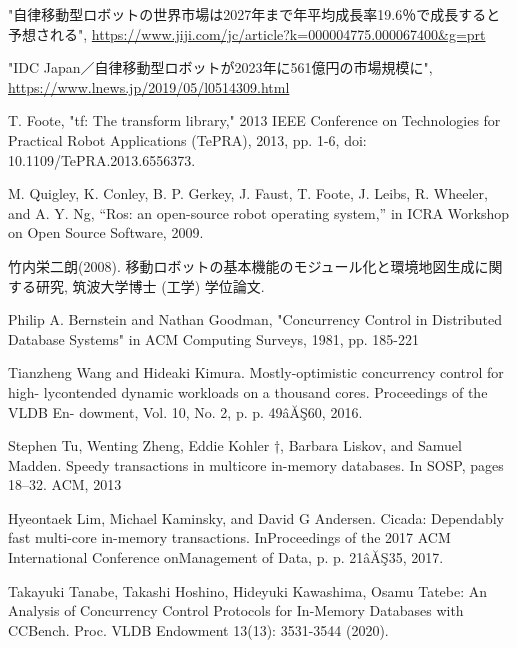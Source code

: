 \documentclass[a4paper]{jreport}	%
\begin{document}
\newpage
{}
\renewcommand{\bibname}{参考文献}


%
%

	
\begin{thebibliography}{99}

 "自律移動型ロボットの世界市場は2027年まで年平均成長率19.6％で成長すると予想される", \url{https://www.jiji.com/jc/article?k=000004775.000067400&g=prt}

 "IDC Japan／自律移動型ロボットが2023年に561億円の市場規模に", \url{https://www.lnews.jp/2019/05/l0514309.html}

 T. Foote, "tf: The transform library," 2013 IEEE Conference on Technologies for Practical Robot Applications (TePRA), 2013, pp. 1-6, doi: 10.1109/TePRA.2013.6556373.

 M. Quigley, K. Conley, B. P. Gerkey, J. Faust, T. Foote, J. Leibs, R. Wheeler, and A. Y. Ng, “Ros: an open-source robot operating system,” in ICRA Workshop on Open Source Software, 2009.

 竹内栄二朗(2008). 移動ロボットの基本機能のモジュール化と環境地図生成に関する研究, 筑波大学博士 (工学) 学位論文.

 Philip A. Bernstein and Nathan Goodman, "Concurrency Control in Distributed Database Systems" in ACM Computing Surveys, 1981, pp. 185-221

 Tianzheng Wang and Hideaki Kimura. Mostly-optimistic concurrency control for high- lycontended dynamic workloads on a thousand cores. Proceedings of the VLDB En- dowment, Vol. 10, No. 2, p. p. 49âĂŞ60, 2016.

 Stephen Tu, Wenting Zheng, Eddie Kohler †, Barbara Liskov,
and Samuel Madden. Speedy transactions in multicore in-memory
databases. In SOSP, pages 18–32. ACM, 2013

 Hyeontaek Lim, Michael Kaminsky, and David G Andersen. Cicada: Dependably fast multi-core in-memory transactions. InProceedings of the 2017 ACM International Conference onManagement of Data, p. p. 21âĂŞ35, 2017.

 Takayuki Tanabe, Takashi Hoshino, Hideyuki Kawashima, Osamu Tatebe: An Analysis of Concurrency Control Protocols for In-Memory Databases with CCBench. Proc. VLDB Endowment 13(13): 3531-3544 (2020).


\end{thebibliography}
\end{document}
